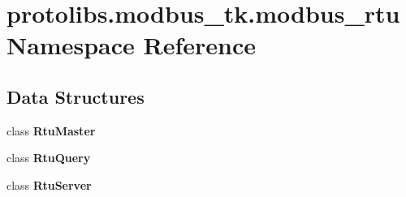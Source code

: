 \section{protolibs.\+modbus\+\_\+tk.\+modbus\+\_\+rtu Namespace Reference}
\label{namespaceprotolibs_1_1modbus__tk_1_1modbus__rtu}
\subsection*{Data Structures}
\begin{DoxyCompactItemize}
\item 
class {\bf Rtu\+Master}
\item 
class {\bf Rtu\+Query}
\item 
class {\bf Rtu\+Server}
\end{DoxyCompactItemize}
